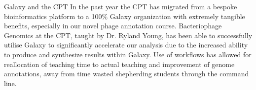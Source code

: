 \documentclass[final,t,20pt]{beamer}
\begin{document}
\begin{frame}[fragile]
\begin{columns}[t]
\begin{column}{.3\linewidth}
\begin{block}{Galaxy and the CPT}
                In the past year the CPT has migrated from a bespoke
                bioinformatics platform to a 100\% Galaxy organization with
                extremely tangible benefits, especially in our novel phage
                annotation course. Bacteriophage Genomics at the CPT, taught by
                Dr. Ryland Young, has been able to successfully utilise Galaxy
                to significantly accelerate our analysis due to the increased
                ability to produce and synthesize results within Galaxy. Use of
                workflows has allowed for reallocation of teaching time to
                actual teaching and improvement of genome annotations, away
                from time wasted shepherding students through the command line.
            \end{block}
    \end{column}
  \end{columns}
\end{frame}
\end{document}
